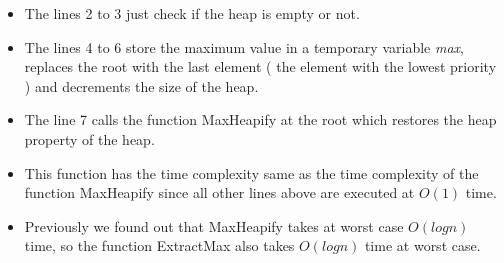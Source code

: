     \begin{itemize}
        \item The lines 2 to 3 just check if the heap is empty or not.
        \item The lines 4 to 6 store the maximum value in a temporary variable   \textit{max}, replaces the root with the last element ( the element with  the lowest priority ) and decrements the size of the heap.
        \item The line 7 calls the function Max\textunderscore Heapify at the root which restores the heap property of the heap.
        \item This function has the time complexity same as the time complexity of the function Max\textunderscore Heapify since all other lines above are 
        executed at $O(1)$ time.
        \item Previously we found out that Max\textunderscore Heapify takes at worst case $O(log n)$ time, so the function ExtractMax also takes $O(log n)$ time at worst case.
    \end{itemize}
